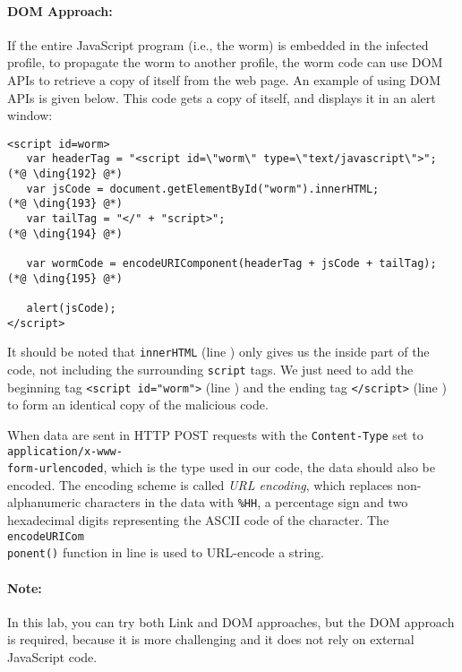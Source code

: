 \paragraph{DOM Approach:} If the entire JavaScript program (i.e., the worm) is 
    embedded in the infected profile, 
    to propagate the worm to another profile, the worm code can use
    DOM APIs to retrieve a copy of itself from the web page.
    An example of using DOM APIs is given below. This code
    gets a copy of itself, and displays it in an alert window:

{\footnotesize
\begin{lstlisting}
<script id=worm>
   var headerTag = "<script id=\"worm\" type=\"text/javascript\">"; (*@ \ding{192} @*)
   var jsCode = document.getElementById("worm").innerHTML;          (*@ \ding{193} @*)
   var tailTag = "</" + "script>";                                  (*@ \ding{194} @*)
   
   var wormCode = encodeURIComponent(headerTag + jsCode + tailTag); (*@ \ding{195} @*)
      
   alert(jsCode);
</script>
\end{lstlisting}
}


It should be noted that {\tt innerHTML} (line ) only gives us the inside part of the
code, not including the surrounding {\tt script} tags. We just need to add the beginning tag
{\tt <script id="worm">} (line ) and the ending tag {\tt </script>} (line )
to form an identical copy of the malicious code.

When data are sent in HTTP POST requests with the {\tt Content-Type} set to {\tt
application/x-www-\\form-urlencoded}, which is the type used in our code, the data should also
be encoded. The encoding scheme is called \textit{URL encoding}, which replaces
non-alphanumeric characters in the data with {\tt \%HH}, a percentage sign and two hexadecimal
digits representing the ASCII code of the character. The {\tt encodeURICom\\ponent()} function
in line  is used to URL-encode a string.

\paragraph{Note:} In this lab, you can try both Link and DOM approaches, but the DOM approach
is required, because it is more challenging and it does not rely on external JavaScript code.




